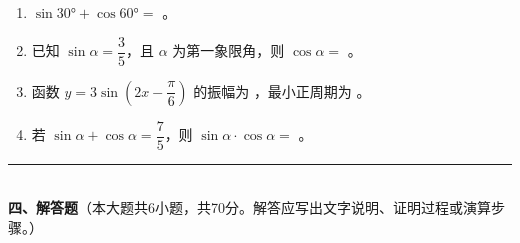 \documentclass[12pt, a4paper]{ctexart}
\begin{document}
\vspace{6pt}

\begin{enumerate}[resume]
\item $\sin 30°+\cos 60°=$ \underline{\hspace{2cm}}。

\item 已知 $\sin\alpha=\dfrac{3}{5}$，且 $\alpha$ 为第一象限角，则 $\cos\alpha=$ \underline{\hspace{2cm}}。

\item 函数 $y=3\sin\!\left(2x-\dfrac{\pi}{6}\right)$ 的振幅为 \underline{\hspace{2cm}}，最小正周期为 \underline{\hspace{2cm}}。

\item 若 $\sin\alpha+\cos\alpha=\dfrac{7}{5}$，则 $\sin\alpha\cdot\cos\alpha=$ \underline{\hspace{2cm}}。
\end{enumerate}

\vspace{6pt}

\noindent\rule{\textwidth}{0.4pt}\\[2pt]
{\large\bfseries 四、解答题}（本大题共6小题，共70分。解答应写出文字说明、证明过程或演算步骤。）

\vspace{6pt}
\end{document}
